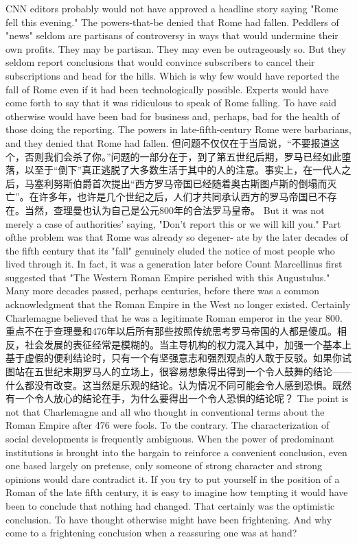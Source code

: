 \begin{paracol}{2}
\switchcolumn
CNN editors probably would not have approved a headline story saying "Rome fell this evening." The powers-that-be denied that Rome had fallen. Peddlers of "news" seldom are partisans of controversy in ways that would undermine their own profits. They may be partisan. They may even be outrageously so. But they seldom report conclusions that would convince subscribers to cancel their subscriptions and head for the hills. Which is why few would have reported the fall of Rome even if it had been technologically possible. Experts would have come forth to say that it was ridiculous to speak of Rome falling. To have said otherwise would have been bad for business and, perhaps, bad for the health of those doing the reporting. The powers in late-fifth-century Rome were barbarians, and they denied that Rome had fallen.
\switchcolumn*
但问题不仅仅在于当局说，“不要报道这个，否则我们会杀了你。”问题的一部分在于，到了第五世纪后期，罗马已经如此堕落，以至于“倒下”真正逃脱了大多数生活于其中的人的注意。事实上，在一代人之后，马塞利努斯伯爵首次提出“西方罗马帝国已经随着奥古斯图卢斯的倒塌而灭亡”。在许多年，也许是几个世纪之后，人们才共同承认西方的罗马帝国已不存在。当然，查理曼也认为自己是公元800年的合法罗马皇帝。
\switchcolumn
But it was not merely a case of authorities' saying, "Don't report this or we will kill you." Part ofthe problem was that Rome was already so degener- ate by the later decades of the fifth century that its "fall" genuinely eluded the notice of most people who lived through it. In fact, it was a generation later before Count Marcellinus first suggested that "The Western Roman Empire perished with this Augustulus." Many more decades passed, perhaps centuries, before there was a common acknowledgment that the Roman Empire in the West no longer existed. Certainly Charlemagne believed that he was a legitimate Roman emperor in the year 800.  
\switchcolumn*
重点不在于查理曼和476年以后所有那些按照传统思考罗马帝国的人都是傻瓜。相反，社会发展的表征经常是模糊的。当主导机构的权力混入其中，加强一个基本上基于虚假的便利结论时，只有一个有坚强意志和强烈观点的人敢于反驳。如果你试图站在五世纪末期罗马人的立场上，很容易想象得出得到一个令人鼓舞的结论——什么都没有改变。这当然是乐观的结论。认为情况不同可能会令人感到恐惧。既然有一个令人放心的结论在手，为什么要得出一个令人恐惧的结论呢？
\switchcolumn
The point is not that Charlemagne and all who thought in conventional terms about the Roman Empire after 476 were fools. To the contrary. The characterization of social developments is frequently ambiguous. When the power of predominant institutions is brought into the bargain to reinforce a convenient conclusion, even one based largely on pretense, only someone of strong character and strong opinions would dare contradict it. If you try to put yourself in the position of a Roman of the late fifth century, it is easy to imagine how tempting it would have been to conclude that nothing had changed. That certainly was the optimistic conclusion. To have thought otherwise might have been frightening. And why come to a frightening conclusion when a reassuring one was at hand? 


\end{paracol}
